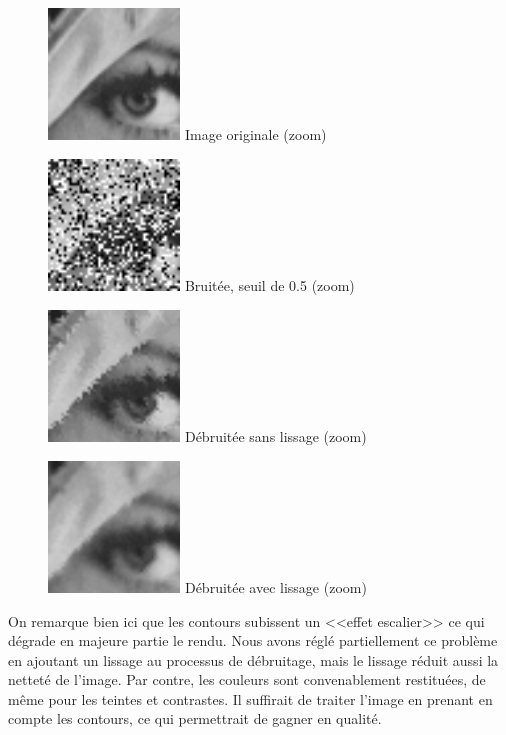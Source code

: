 \documentclass{article}
\begin{document}
		\begin{figure}[!ht]
			\centering
			\begin{minipage}[t]{3.5cm}
				\centering
				\includegraphics[width=3.5cm,height=3.5cm]{lenaZOOM.jpg}
				Image originale (zoom)
			\end{minipage}
			\begin{minipage}[t]{3.5cm}
				\centering
				\includegraphics[width=3.5cm,height=3.5cm]{SaltAndPepper/noisy_50_ZOOM.jpg}
				Bruitée, seuil de 0.5 (zoom)
			\end{minipage}
			\begin{minipage}[t]{3.5cm}
				\centering
				\includegraphics[width=3.5cm,height=3.5cm]{SaltAndPepper/algo1_50_ZOOM.jpg}
				Débruitée sans lissage (zoom)
			\end{minipage}
			\begin{minipage}[t]{3.5cm}
				\centering
				\includegraphics[width=3.5cm,height=3.5cm]{SaltAndPepper/algo2_50_ZOOM.jpg}
				Débruitée avec lissage (zoom)
			\end{minipage}
		\end{figure}
		On remarque bien ici que les contours subissent un <<effet escalier>> ce qui dégrade en majeure partie le rendu. Nous avons réglé partiellement ce problème en ajoutant un lissage au processus de débruitage, mais le lissage réduit aussi la netteté de l'image. Par contre, les couleurs sont convenablement restituées, de même pour les teintes et contrastes. Il suffirait de traiter l'image en prenant en compte les contours, ce qui permettrait de gagner en qualité.
\end{document}
